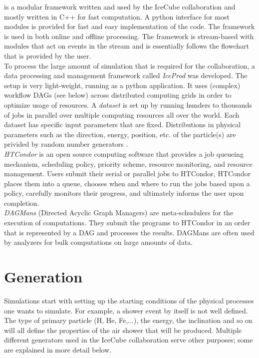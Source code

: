 \begin{corollary}
 is a modular framework written and used by the IceCube collaboration and mostly written in C++ for fast computation. A python interface for most modules is provided for fast and easy implementation of the code. The framework is used in both online and offline processing. The framework is stream-based with modules that act on events in the stream and is essentially follows the flowchart that is provided by the user.\\

\noindent To process the large amount of simulation that is required for the collaboration, a data processing and management framework called \textit{IceProd} was developed. The setup is very light-weight, running as a python application. It uses (complex) workflow DAGs (see below) across distributed computing grids in order to optimize usage of resources. A \textit{dataset} is set up by running hunders to thousands of jobs in parallel over multiple computing resources all over the world. Each dataset has specific input parameters that are fixed. Distributions in physical parameters such as the direction, energy, position, etc. of the particle(s) are privided by random number generators \cite{1742-6596-664-6-062056}.\\

\noindent \textit{HTCondor} is an open source computing software that provides a job queueing mechanism, scheduling policy, priority scheme, resource monitoring, and resource management. Users submit their serial or parallel jobs to HTCondor, HTCondor places them into a queue, chooses when and where to run the jobs based upon a policy, carefully monitors their progress, and ultimately informs the user upon completion.\\

\noindent \textit{DAGMans} (Directed Acyclic Graph Managers) are meta-schudulers for the execution of computations. They submit the programs to HTCondor in an order that is represented by a DAG and processes the results. DAGMans are often used by analyzers for bulk computations on large amounts of data.
\end{corollary}

\section{Generation}
Simulations start with setting up the starting conditions of the physical processes one wants to simulate. For example, a shower event by itself is not well defined. The type of primary particle (H, He, Fe,...), the energy, the inclination and so on will all define the properties of the air shower that will be produced. Multiple different generators used in the IceCube collaboration serve other purposes; some are explained in more detail below.

